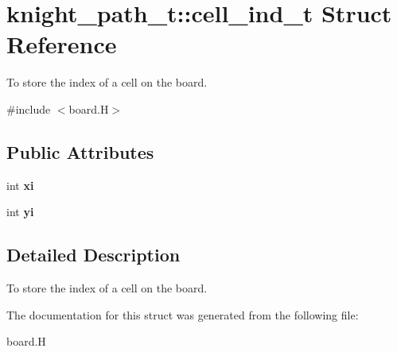 \hypertarget{structknight__path__t_1_1cell__ind__t}{\section{knight\-\_\-path\-\_\-t\-:\-:cell\-\_\-ind\-\_\-t \-Struct \-Reference}
\label{structknight__path__t_1_1cell__ind__t}
}


\-To store the index of a cell on the board.  




{\ttfamily \#include $<$board.\-H$>$}

\subsection*{\-Public \-Attributes}
\begin{DoxyCompactItemize}
\item 
\hypertarget{structknight__path__t_1_1cell__ind__t_aac90b148b57ff7c1cf10f96e352ad131}{int {\bfseries xi}}\label{structknight__path__t_1_1cell__ind__t_aac90b148b57ff7c1cf10f96e352ad131}

\item 
\hypertarget{structknight__path__t_1_1cell__ind__t_aabdd1a00e480238e0702d8d4e7378a9a}{int {\bfseries yi}}\label{structknight__path__t_1_1cell__ind__t_aabdd1a00e480238e0702d8d4e7378a9a}

\end{DoxyCompactItemize}


\subsection{\-Detailed \-Description}
\-To store the index of a cell on the board. 

\-The documentation for this struct was generated from the following file\-:\begin{DoxyCompactItemize}
\item 
board.\-H\end{DoxyCompactItemize}

